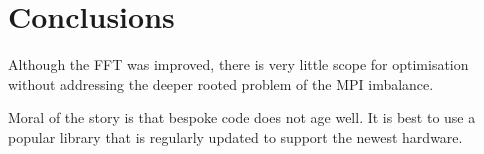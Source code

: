 \documentclass[a4paper,11pt]{report}
\begin{document}
\section{Conclusions}
Although the FFT was improved, there is very little scope for optimisation without addressing the deeper rooted problem of the MPI imbalance.
\par
Moral of the story is that bespoke code does not age well. It is best to use a popular library that is regularly updated to support the newest hardware. 





%
%
%
%




\end{document}
